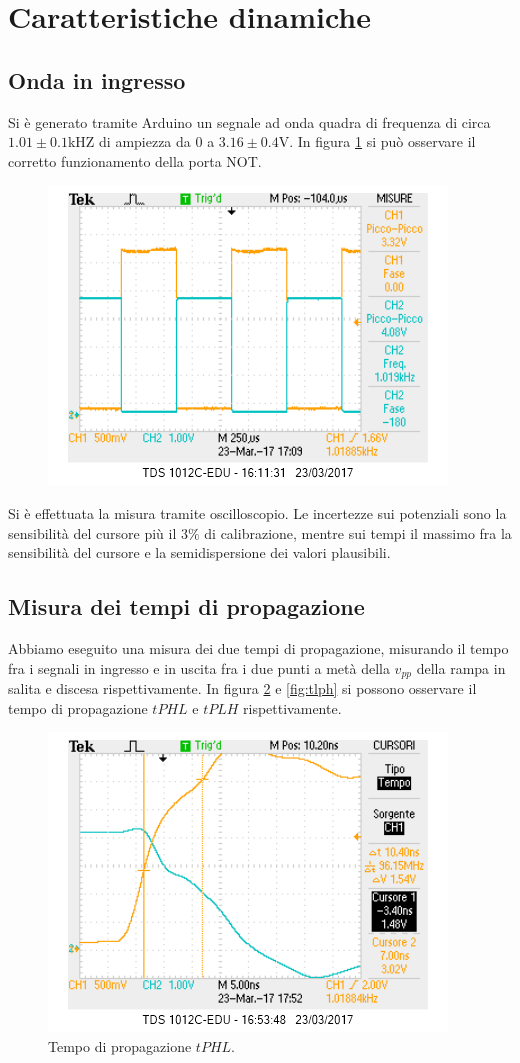 \documentclass[10pt,a4paper]{article}
\begin{document}
\section{Caratteristiche dinamiche}
\subsection{Onda in ingresso}
Si è generato tramite Arduino un segnale ad onda quadra di frequenza di circa $1.01\pm0.1$kHZ di ampiezza da 0 a $3.16\pm 0.4$V.
In figura \ref{fig:ondanot} si può osservare il corretto funzionamento della porta NOT.
\begin{figure}
\centering
\includegraphics[scale=0.7]{ondanot.png}
\caption{\label{fig:ondanot}}
\end{figure}
Si è effettuata la misura tramite oscilloscopio. Le incertezze sui potenziali sono la sensibilità del cursore più il $3\%$ di calibrazione, mentre sui tempi il massimo fra la sensibilità del cursore e la semidispersione dei valori plausibili.

\subsection{Misura dei tempi di propagazione}
Abbiamo eseguito una misura dei due tempi di propagazione, misurando il tempo fra i segnali in ingresso e in uscita fra i due punti a metà della $v_{pp}$ della rampa in salita e discesa rispettivamente.
In figura \ref{fig:tphl} e \ref{fig:tlph} si possono osservare il tempo di propagazione $tPHL$ e $tPLH$ rispettivamente.
\begin{figure}
\centering
\includegraphics[scale=0.6]{tphl(meglio).png}
\caption{Tempo di propagazione $tPHL$.\label{fig:tphl}}
\end{figure}
\end{document}
